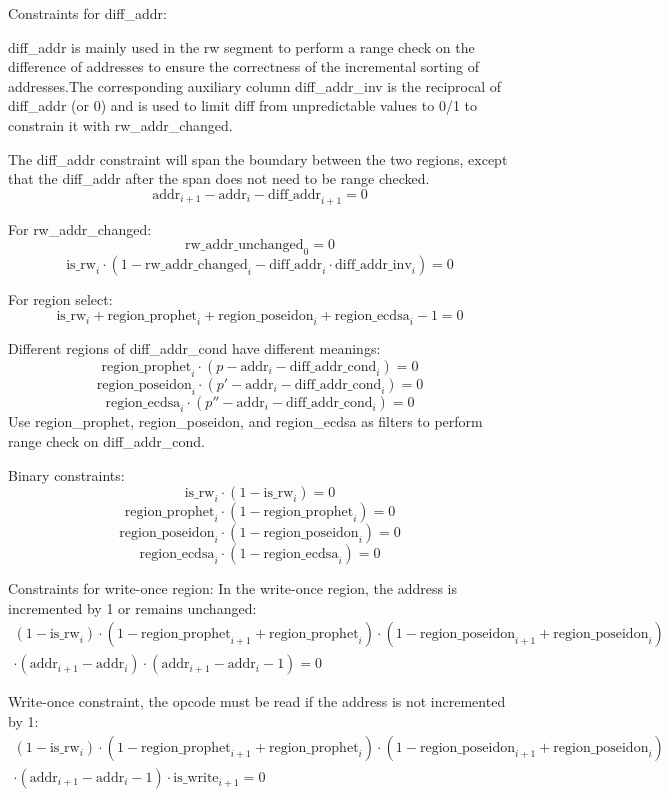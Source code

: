 Constraints for diff\_addr:

diff\_addr is mainly used in the rw segment to perform a range check on the difference of addresses to ensure the correctness of the incremental sorting of addresses.The corresponding auxiliary
column diff\_addr\_inv is the reciprocal of diff\_addr (or 0) and is used to limit diff from unpredictable values to 0/1 to constrain it with rw\_addr\_changed.

The diff\_addr constraint will span the boundary between the two regions, except that the diff\_addr after the span does not need to be range checked.
\[ \mathrm{addr}_{i+1} - \mathrm{addr}_i - \mathrm{diff\_addr}_{i+1} = 0 \]

For rw\_addr\_changed:
\[ \mathrm{rw\_addr\_unchanged}_0 = 0 \]
\[ \mathrm{is\_rw}_i \cdot (1 - \mathrm{rw\_addr\_changed}_i - \mathrm{diff\_addr}_i \cdot \mathrm{diff\_addr\_inv}_i) = 0 \]

For region select:
\[ \mathrm{is\_rw}_i + \mathrm{region\_prophet}_i + \mathrm{region\_poseidon}_i + \mathrm{region\_ecdsa}_i - 1 = 0 \]

Different regions of diff\_addr\_cond have different meanings:
\[ \mathrm{region\_prophet}_i \cdot (p - \mathrm{addr}_i - \mathrm{diff\_addr\_cond}_i) = 0 \]
\[ \mathrm{region\_poseidon}_i \cdot (p'- \mathrm{addr}_i - \mathrm{diff\_addr\_cond}_i) = 0 \]
\[ \mathrm{region\_ecdsa}_i \cdot (p'' - \mathrm{addr}_i - \mathrm{diff\_addr\_cond}_i) = 0 \]
Use region\_prophet, region\_poseidon, and region\_ecdsa as filters to perform range check on diff\_addr\_cond.

Binary constraints:
\[ \mathrm{is\_rw}_i \cdot (1 - \mathrm{is\_rw}_i) = 0 \]
\[ \mathrm{region\_prophet}_i \cdot (1 - \mathrm{region\_prophet}_i) = 0 \]
\[ \mathrm{region\_poseidon}_i \cdot (1 - \mathrm{region\_poseidon}_i)=0 \]
\[ \mathrm{region\_ecdsa}_i \cdot (1 - \mathrm{region\_ecdsa}_i)= 0 \]

Constraints for write-once region:
In the write-once region, the address is incremented by 1 or remains unchanged:
\begin{multline*}
    (1-\mathrm{is\_rw}_i) \cdot (1-\mathrm{region\_prophet}_{i+1}+\mathrm{region\_prophet}_i) \cdot (1-\mathrm{region\_poseidon}_{i+1}+\mathrm{region\_poseidon}_i) \\
    \cdot (\mathrm{addr}_{i+1}-\mathrm{addr}_i) \cdot (\mathrm{addr}_{i+1}-\mathrm{addr}_i-1)=0
\end{multline*}

Write-once constraint, the opcode must be read if the address is not incremented by 1:
\begin{multline*}
    (1-\mathrm{is\_rw}_i) \cdot (1-\mathrm{region\_prophet}_{i+1}+\mathrm{region\_prophet}_i) \cdot (1-\mathrm{region\_poseidon}_{i+1}+\mathrm{region\_poseidon}_i) \\
    \cdot (\mathrm{addr}_{i+1}-\mathrm{addr}_i-1) \cdot \mathrm{is\_write}_{i+1}=0
\end{multline*}

